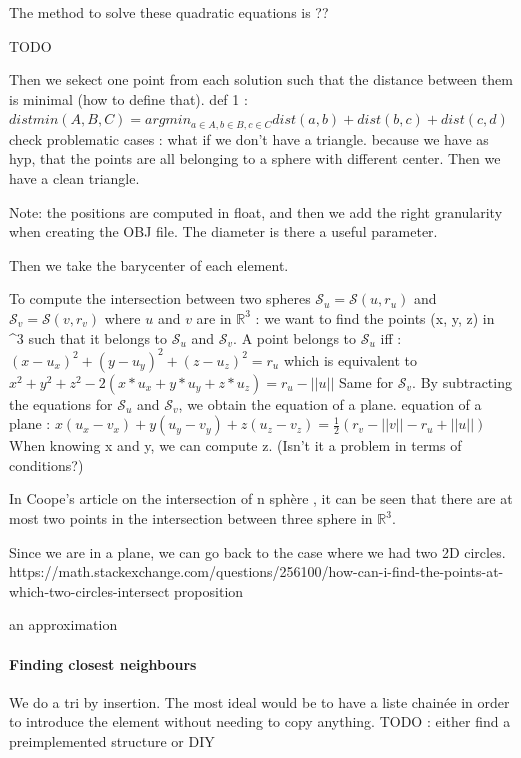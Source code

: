 \documentclass{article}
\begin{document}
The method to solve these quadratic equations is ?? 

TODO

Then we sekect one point from each solution such that the distance between them is minimal (how to define that). 
def 1 : $distmin(A, B, C) = argmin_{a \in A, b \in B, c \in C}  dist(a, b) + dist(b, c) + dist(c, d)$
check problematic cases : what if we don't have a triangle.
because we have as hyp, that the points are all belonging to a sphere with different center. Then we have a clean triangle. 


Note: the positions are computed in float, and then we add the right granularity when creating the OBJ file. The diameter is there a useful parameter. 

Then we take the barycenter of each element. 

To compute the intersection between two spheres $\mathcal{S}_{u} = \mathcal{S}(u, r_{u})$ and $\mathcal{S}_{v} = \mathcal{S}(v, r_{v})$ where $u$ and $v$ are in $\mathbb{R}^3$ :
we want to find the points (x, y, z) in ^{3} such that it belongs to $\mathcal{S}_{u}$ and $\mathcal{S}_{v}$. 
A point belongs to $\mathcal{S}_{u}$ iff : 
$ (x-u_{x})^2 + (y - u_{y})^2 + (z - u_{z})^2 = r_{u}$
which is equivalent to \\
$x^2+ y^2+z^2 - 2 (x * u_{x} + y * u_{y} + z * u_{z}) = r_{u} - ||u||$
Same for $\mathcal{S}_v$.  
By subtracting the equations for $\mathcal{S}_u$ and $\mathcal{S}_v$, we obtain the equation of a plane. 
equation of a plane : 
$x(u_{x} - v_{x}) + y (u_{y} - v_{y}) + z (u_{z} - v_{z}) = \frac{1}{2} (r_{v} - ||v|| - r_{u} + ||u||)$
When knowing x and y, we can compute z. (Isn't it a problem in terms of conditions?)

In Coope's article on the intersection of n sphère \cite{nsphere}, it can be seen that there are at most two points in the intersection between three sphere in $\mathbb{R}^3$. 

Since we are in a plane, we can go back to the case where we had two 2D circles.  
https://math.stackexchange.com/questions/256100/how-can-i-find-the-points-at-which-two-circles-intersect proposition

an approximation


\paragraph{Finding closest neighbours}
We do a tri by insertion. 
The most ideal would be to have a liste chainée in order to introduce the element without needing to copy anything. 
TODO : either find a preimplemented structure or DIY
\end{document}
